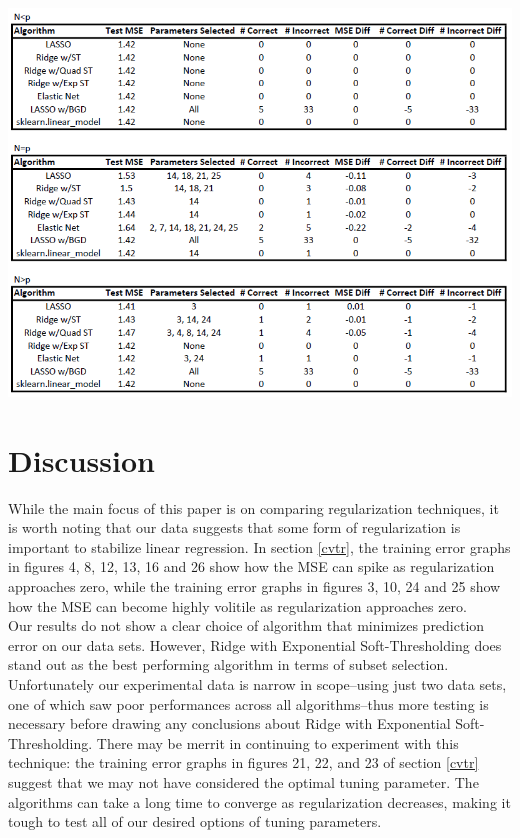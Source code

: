 \documentclass[11pt]{article}
\begin{document}
\begin{center}
\includegraphics[scale=0.7]{corr.PNG}
\end{center}


\section{Discussion}
While the main focus of this paper is on comparing regularization techniques, it is worth noting that our data suggests that some form of regularization is important to stabilize linear regression.  In section \ref{cvtr}, the training error graphs in figures 4, 8, 12, 13, 16 and 26 show how the MSE can spike as regularization approaches zero, while the training error graphs in figures 3, 10, 24 and 25 show how the MSE can become highly volitile as regularization approaches zero.  \\

Our results do not show a clear choice of algorithm that minimizes prediction error on our data sets.  However, Ridge with Exponential Soft-Thresholding does stand out as the best performing algorithm in terms of subset selection.  Unfortunately our experimental data is narrow in scope--using just two data sets, one of which saw poor performances across all algorithms--thus more testing is necessary before drawing any conclusions about Ridge with Exponential Soft-Thresholding.  There may be merrit in continuing to experiment with this technique: the training error graphs in figures 21, 22, and 23 of section \ref{cvtr} suggest that we may not have considered the optimal tuning parameter.  The algorithms can take a long time to converge as regularization decreases, making it tough to test all of our desired options of tuning parameters.  \\
\end{document}
